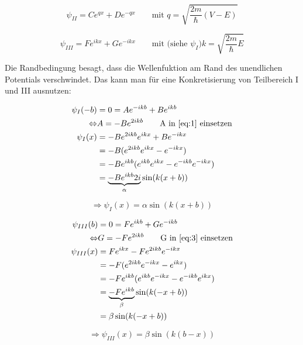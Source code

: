 \begin{equation}
  \label{eq:2}
  \psi_{II} = Ce^{q x}+De^{-qx}\qquad \text{mit } q = \sqrt{\frac{2m}{\hbar}(V-E)}
\end{equation}

\begin{equation}
  \label{eq:3}
  \psi_{III} = Fe^{ikx}+Ge^{-ikx}\qquad \text{mit (siehe }\psi_{I}) k = \sqrt{\frac{2m}{\hbar}E}
\end{equation}


Die Randbedingung besagt, dass die Wellenfuktion am Rand des unendlichen  Potentials verschwindet. Das kann man für eine Konkretisierung von Teilbereich I und III ausnutzen:

\begin{align}
  \label{eq:4}
  \psi_{I}(-b) &= 0 = Ae^{-ikb}+Be^{ikb} \notag \\
\Leftrightarrow & A = -Be^{2ikb}\qquad\text{A in }\ref{eq:1}\text{ einsetzen} \notag\\
\psi_I(x)&=-Be^{2ikb}e^{ikx}+Be^{-ikx} \notag \\
&=-B(e^{2ikb}e^{ikx}-e^{-ikx}) \notag\\
&=-B e^{ikb}(e^{ikb}e^{ikx}-e^{-ikb}e^{-ikx}) \notag\\
&=\underbrace{-B e^{ikb}2i}_{\alpha}\sin(k(x+b))
\end{align}

\begin{equation}
  \label{eq:5}
  \Rightarrow \psi_I(x)=\alpha\sin(k(x+b))
\end{equation}

\begin{align}
  \label{eq:6}
  \psi_{III}(b) &= 0 = Fe^{ikb}+Ge^{-ikb} \notag \\
\Leftrightarrow & G = -Fe^{2ikb}\qquad\text{G in }\ref{eq:3}\text{ einsetzen} \notag\\
\psi_{III}(x)&=Fe^{ikx} -Fe^{2ikb} e^{-ikx} \notag \\
&=-F(e^{2ikb}e^{-ikx}-e^{ikx}) \notag\\
&=-Fe^{ikb}(e^{ikb}e^{-ikx}-e^{-ikb}e^{ikx}) \notag\\
&=\underbrace{-Fe^{ikb} }_{\beta}\sin(k(-x+b)) \notag\\
&=\beta\sin(k(-x+b))
\end{align}

\begin{equation}
  \label{eq:7}
  \Rightarrow \psi_{III}(x)=\beta\sin(k(b-x))
\end{equation}

